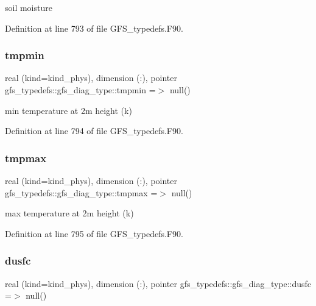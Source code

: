 soil moisture 



Definition at line 793 of file G\+F\+S\+\_\+typedefs.\+F90.

\mbox{\label{structgfs__typedefs_1_1gfs__diag__type_a7cf9caa696233f4427b4ba524064f78a}} 
\subsubsection{tmpmin}
{\footnotesize\ttfamily real (kind=kind\+\_\+phys), dimension (\+:), pointer gfs\+\_\+typedefs\+::gfs\+\_\+diag\+\_\+type\+::tmpmin =$>$ null()}



min temperature at 2m height (k) 



Definition at line 794 of file G\+F\+S\+\_\+typedefs.\+F90.

\mbox{\label{structgfs__typedefs_1_1gfs__diag__type_a7ac1c4a9dc314ece5a3169e62fd5af47}} 
\subsubsection{tmpmax}
{\footnotesize\ttfamily real (kind=kind\+\_\+phys), dimension (\+:), pointer gfs\+\_\+typedefs\+::gfs\+\_\+diag\+\_\+type\+::tmpmax =$>$ null()}



max temperature at 2m height (k) 



Definition at line 795 of file G\+F\+S\+\_\+typedefs.\+F90.

\mbox{\label{structgfs__typedefs_1_1gfs__diag__type_a74b793fc2479368d9f48c644eea4b88f}} 
\subsubsection{dusfc}
{\footnotesize\ttfamily real (kind=kind\+\_\+phys), dimension  (\+:), pointer gfs\+\_\+typedefs\+::gfs\+\_\+diag\+\_\+type\+::dusfc =$>$ null()}



